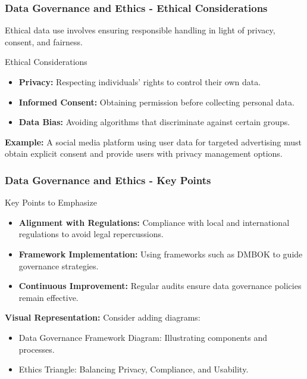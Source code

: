 \documentclass[aspectratio=169]{beamer}
\begin{document}
\begin{frame}[fragile]
    \frametitle{Data Governance and Ethics - Ethical Considerations}
    Ethical data use involves ensuring responsible handling in light of privacy, consent, and fairness.

    \begin{block}{Ethical Considerations}
        \begin{itemize}
            \item \textbf{Privacy:} Respecting individuals' rights to control their own data.
            \item \textbf{Informed Consent:} Obtaining permission before collecting personal data.
            \item \textbf{Data Bias:} Avoiding algorithms that discriminate against certain groups.
        \end{itemize}
    \end{block}
    
    \textbf{Example:} A social media platform using user data for targeted advertising must obtain explicit consent and provide users with privacy management options.
\end{frame}

\begin{frame}[fragile]
    \frametitle{Data Governance and Ethics - Key Points}
    \begin{block}{Key Points to Emphasize}
        \begin{itemize}
            \item \textbf{Alignment with Regulations:} Compliance with local and international regulations to avoid legal repercussions.
            \item \textbf{Framework Implementation:} Using frameworks such as DMBOK to guide governance strategies.
            \item \textbf{Continuous Improvement:} Regular audits ensure data governance policies remain effective.
        \end{itemize}
    \end{block}
    
    \textbf{Visual Representation:} Consider adding diagrams:
    \begin{itemize}
        \item Data Governance Framework Diagram: Illustrating components and processes.
        \item Ethics Triangle: Balancing Privacy, Compliance, and Usability.
    \end{itemize}
\end{frame}
\end{document}
